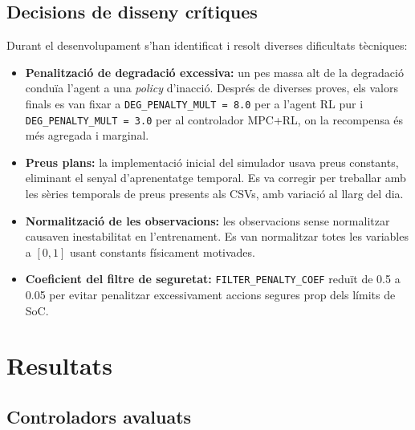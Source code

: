 \documentclass[a4paper,12pt,twoside]{ThesisStyle}
\begin{document}
\section{Decisions de disseny crítiques}

Durant el desenvolupament s'han identificat i resolt diverses dificultats tècniques:

\begin{itemize}
    \item \textbf{Penalització de degradació excessiva:} un pes massa alt de la degradació conduïa l'agent a una \textit{policy} d'inacció. Després de diverses proves, els valors finals es van fixar a \texttt{DEG\_PENALTY\_MULT = 8.0} per a l'agent RL pur i \texttt{DEG\_PENALTY\_MULT = 3.0} per al controlador MPC+RL, on la recompensa és més agregada i marginal.
    \item \textbf{Preus plans:} la implementació inicial del simulador usava preus constants, eliminant el senyal d'aprenentatge temporal. Es va corregir per treballar amb les sèries temporals de preus presents als CSVs, amb variació al llarg del dia.
    \item \textbf{Normalització de les observacions:} les observacions sense normalitzar causaven inestabilitat en l'entrenament. Es van normalitzar totes les variables a $[0, 1]$ usant constants físicament motivades.
    \item \textbf{Coeficient del filtre de seguretat:} \texttt{FILTER\_PENALTY\_COEF} reduït de 0.5 a 0.05 per evitar penalitzar excessivament accions segures prop dels límits de SoC.
\end{itemize}


\chapter{Resultats}
\label{cap:result}

\section{Controladors avaluats}
\end{document}
